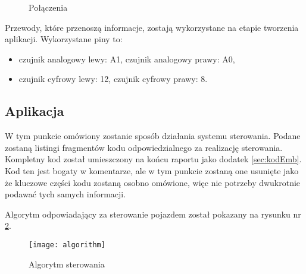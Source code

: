 \documentclass[11pt]{article}
\begin{document}
\begin{figure}[htbp!]
	\centering
	
	\hfill%
	\hfill%
	
	\caption{Połączenia \label{fig:okablowanie}}
\end{figure}

Przewody, które przenoszą informacje, zostają wykorzystane na etapie tworzenia aplikacji. Wykorzystane piny to:
\begin{itemize}
\item czujnik analogowy lewy: A1, czujnik analogowy prawy: A0,
\item czujnik cyfrowy lewy: 12, czujnik cyfrowy prawy: 8.
\end{itemize}

\subsection{Aplikacja}

W tym punkcie omówiony zostanie sposób działania systemu sterowania.
Podane zostaną listingi fragmentów kodu odpowiedzialnego za realizację sterowania. Kompletny kod został umieszczony na końcu raportu jako dodatek \ref{sec:kodEmb}. Kod ten jest bogaty w komentarze, ale w tym punkcie zostaną one usunięte jako że kluczowe części kodu zostaną osobno omówione, więc nie potrzeby dwukrotnie podawać tych samych informacji.

Algorytm odpowiadający za sterowanie pojazdem został pokazany na rysunku nr \ref{fig:algorytm}.

\begin{figure}[hbtp!]
	\centering
	\texttt{[image: algorithm]}
	\caption{Algorytm sterowania \label{fig:algorytm}}
\end{figure}
\end{document}
